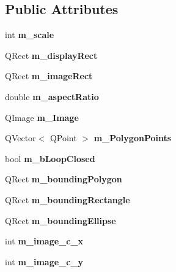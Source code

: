 \subsection*{Public Attributes}
\begin{DoxyCompactItemize}
\item 
\mbox{\label{class_paint_q_label_a2f14ccc35abc58b1b5f675def203f1a5}} 
int {\bfseries m\+\_\+scale}
\item 
\mbox{\label{class_paint_q_label_a82a12e67b0c4d0916736d6ab686b5274}} 
Q\+Rect {\bfseries m\+\_\+display\+Rect}
\item 
\mbox{\label{class_paint_q_label_a5c521eb8af035302726ceb30d3865325}} 
Q\+Rect {\bfseries m\+\_\+image\+Rect}
\item 
\mbox{\label{class_paint_q_label_aa317523c692351ba275ab8d961877332}} 
double {\bfseries m\+\_\+aspect\+Ratio}
\item 
\mbox{\label{class_paint_q_label_a98346a1eb5b6dd9fe5b07e293142b63f}} 
Q\+Image {\bfseries m\+\_\+\+Image}
\item 
\mbox{\label{class_paint_q_label_a2f5060008173c178f3bff4718b668a22}} 
Q\+Vector$<$ Q\+Point $>$ {\bfseries m\+\_\+\+Polygon\+Points}
\item 
\mbox{\label{class_paint_q_label_ad0d70f6b959cce938e2015413945353c}} 
bool {\bfseries m\+\_\+b\+Loop\+Closed}
\item 
\mbox{\label{class_paint_q_label_ab98fc5e0aafa68de5b0f0a2775c0c346}} 
Q\+Rect {\bfseries m\+\_\+bounding\+Polygon}
\item 
\mbox{\label{class_paint_q_label_a82c7a19109e2e455c1af992a312c5809}} 
Q\+Rect {\bfseries m\+\_\+bounding\+Rectangle}
\item 
\mbox{\label{class_paint_q_label_a463e17ba1635d2d23ba5fa35d0927e84}} 
Q\+Rect {\bfseries m\+\_\+bounding\+Ellipse}
\item 
\mbox{\label{class_paint_q_label_ae8ba280e39ab0f61d2f2fc3db88845fe}} 
int {\bfseries m\+\_\+image\+\_\+c\+\_\+x}
\item 
\mbox{\label{class_paint_q_label_af3dcff15c48f0fadadb07a334b22fafe}} 
int {\bfseries m\+\_\+image\+\_\+c\+\_\+y}
\end{DoxyCompactItemize}
